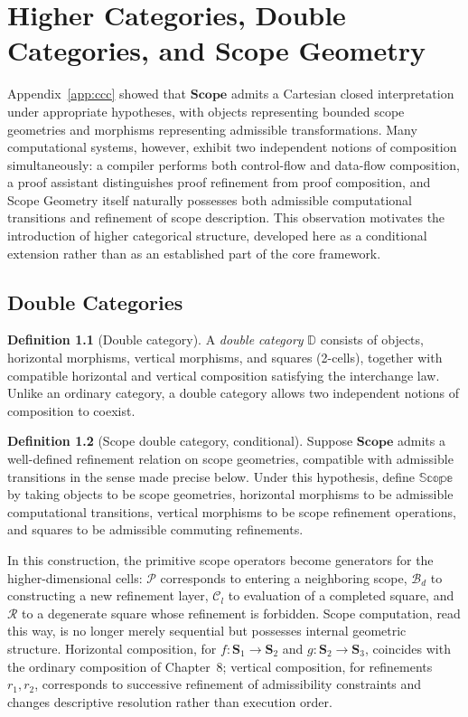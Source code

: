 \documentclass[11pt,twoside,openright]{book}
\numberwithin{equation}{chapter}
\theoremstyle{definition}
\newtheorem{definition}{Definition}[chapter]
\theoremstyle{plain}
\theoremstyle{remark}
\theoremstyle{definition}
\newcommand{\CatScope}{\mathbf{Scope}}
\newcommand{\Scope}{\mathbf{S}}
\newcommand{\Pop}{\mathcal{P}}
\newcommand{\Refuse}{\mathcal{R}}
\newcommand{\Bind}{\mathcal{B}_d}
\newcommand{\Collapse}{\mathcal{C}_l}
\begin{document}
\chapter{Higher Categories, Double Categories, and Scope Geometry}
\label{app:higher}

Appendix~\ref{app:ccc} showed that $\CatScope$ admits a Cartesian closed
interpretation under appropriate hypotheses, with objects representing
bounded scope geometries and morphisms representing admissible
transformations. Many computational systems, however, exhibit two
independent notions of composition simultaneously: a compiler performs
both control-flow and data-flow composition, a proof assistant
distinguishes proof refinement from proof composition, and Scope Geometry
itself naturally possesses both admissible computational transitions and
refinement of scope description. This observation motivates the
introduction of higher categorical structure, developed here as a
conditional extension rather than as an established part of the core
framework.

\section{Double Categories}

\begin{definition}[Double category]
A \emph{double category} $\mathbb{D}$ consists of objects, horizontal
morphisms, vertical morphisms, and squares (2-cells), together with
compatible horizontal and vertical composition satisfying the interchange
law. Unlike an ordinary category, a double category allows two
independent notions of composition to coexist.
\end{definition}

\begin{definition}[Scope double category, conditional]
Suppose $\CatScope$ admits a well-defined refinement relation on scope
geometries, compatible with admissible transitions in the sense made
precise below. Under this hypothesis, define $\mathbb{Scope}$ by taking
objects to be scope geometries, horizontal morphisms to be admissible
computational transitions, vertical morphisms to be scope refinement
operations, and squares to be admissible commuting refinements.
\end{definition}

In this construction, the primitive scope operators become generators for
the higher-dimensional cells: $\Pop$ corresponds to entering a neighboring
scope, $\Bind$ to constructing a new refinement layer, $\Collapse$ to
evaluation of a completed square, and $\Refuse$ to a degenerate square
whose refinement is forbidden. Scope computation, read this way, is no
longer merely sequential but possesses internal geometric structure.
Horizontal composition, for $f:\Scope_1\to\Scope_2$ and
$g:\Scope_2\to\Scope_3$, coincides with the ordinary composition of
Chapter~8; vertical composition, for refinements $r_1,r_2$, corresponds to
successive refinement of admissibility constraints and changes
descriptive resolution rather than execution order.
\end{document}
